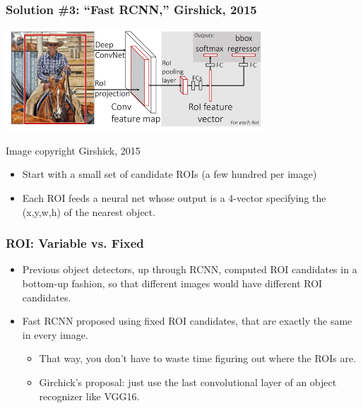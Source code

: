 \documentclass{beamer}
\begin{document}
\begin{frame}
  \frametitle{Solution \#3: ``Fast RCNN,'' Girshick, 2015}
  \centerline{\includegraphics[height=1.5in]{figs/girshick2015_fig1.png}}
  \begin{tiny}Image copyright Girshick, 2015\end{tiny}
  \begin{itemize}
  \item Start with a small set of candidate ROIs (a few hundred
    per image)
  \item Each ROI feeds a neural net whose output is a 4-vector
    specifying the (x,y,w,h) of the nearest object.
  \end{itemize}
\end{frame}

\begin{frame}
  \frametitle{ROI: Variable vs. Fixed}
  \begin{itemize}
  \item Previous object detectors, up through RCNN, computed ROI
    candidates in a bottom-up fashion, so that different images would
    have different ROI candidates.
  \item Fast RCNN proposed using fixed ROI candidates, that are exactly the
    same in every image.
    \begin{itemize}
    \item That way, you don't have to waste time figuring out where the ROIs are.
    \item Girchick's proposal: just use 
      the last convolutional layer of an object recognizer like VGG16.
    \end{itemize}
  \end{itemize}
\end{frame}
\end{document}
